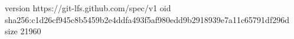 version https://git-lfs.github.com/spec/v1
oid sha256:c1d26cf945c8b5459b2e4ddfa493f5af980edd9b2918939e7a11c65791df296d
size 21960
